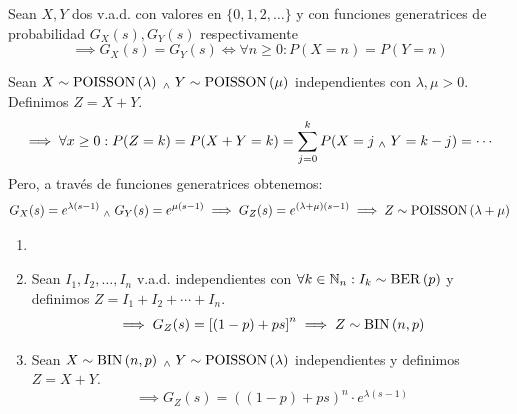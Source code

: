 \begin{teo}[Unicidad]
	Sean $X, Y$ dos v.a.d. con valores en $\{0, 1, 2, \dots\}$ y con funciones generatrices de probabilidad $G_X(s), G_Y(s)$ respectivamente
	\[\implies G_X(s)=G_Y(s) \iff \forall n\geq 0 : P(X=n)=P(Y=n)\]
\end{teo}

\begin{ejem}
	Sean $X\sim\operatorname{POISSON}\left(\lambda\right) \; _{\wedge} \; Y\sim\operatorname{POISSON}\left(\mu\right)$ independientes con $\lambda, \mu > 0$. Definimos $Z=X+Y$.
	\[\implies \forall x \geq 0 : P(Z=k) = P(X+Y=k)= \sum_{j=0}^{k} P(X=j \; _{\wedge} \; Y=k-j) = \cdots\]
	Pero, a través de funciones generatrices obtenemos:
	\[G_X(s)=e^{\lambda(s-1)} \; _{\wedge} \; G_Y(s)=e^{\mu(s-1)} \implies G_{Z}(s)=e^{(\lambda+\mu)(s-1)}\implies Z\sim\operatorname{POISSON}\left(\lambda+\mu\right)\]
\end{ejem}

\begin{ejem}
	\begin{enumerate}
		\item []
		\item Sean $I_1, I_2, \dots, I_n$ v.a.d. independientes con $\forall k \in \mathbb{N}_n :
			      I_k\sim\operatorname{BER}\left(p\right)$ y definimos $Z=I_1+I_2+\cdots+I_n$.
		      \[\implies G_Z(s)={\left[(1-p)+ps\right]}^n \implies Z \sim \operatorname{BIN}\left(n, p\right)\]
		\item Sean $X \sim \operatorname{BIN}\left(n, p\right) \; _{\wedge} \; Y\sim \operatorname{POISSON}\left(\lambda\right)$ independientes y definimos
		      $Z=X+Y$.
		      \[\implies G_Z(s)={\left((1-p)+ps\right)}^n\cdot e^{\lambda(s-1)}\]
	\end{enumerate}
\end{ejem}
